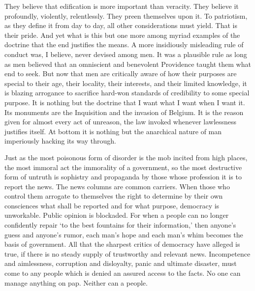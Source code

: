 \documentclass[openany,nobib,nohyper]{tufte-book}
\begin{document}
They believe that edification is more important than veracity. They
believe it profoundly, violently, relentlessly. They preen themselves
upon it. To patriotism, as they define it from day to day, all other
considerations must yield. That is their pride. And yet what is this but
one more among myriad examples of the doctrine that the end justifies
the means. A more insidiously misleading rule of conduct was, I believe,
never devised among men. It was a plausible rule as long as men believed
that an omniscient and benevolent Providence taught them what end to
seek. But now that men are critically aware of how their purposes are
special to their age, their locality, their interests, and their limited
knowledge, it is blazing arrogance to sacrifice hard-won standards of
credibility to some special purpose. It is nothing but the doctrine that
I want what I want when I want it. Its monuments are the Inquisition and
the invasion of Belgium. It is the reason given for almost every act of
unreason, the law invoked whenever lawlessness justifies itself. At
bottom it is nothing but the anarchical nature of man imperiously
hacking its way through.

Just as the most poisonous form of disorder is the mob incited from high
places, the most immoral act the immorality of a government, so the most
destructive form of untruth is sophistry and propaganda by those whose
profession it is to report the news. The news columns are common
carriers. When those who control them arrogate to themselves the right
to determine by their own consciences what shall be reported and for
what purpose, democracy is unworkable. Public opinion is blockaded. For
when a people can no longer confidently repair `to the best fountains
for their information,' then anyone's guess and anyone's rumor, each
man's hope and each man's whim becomes the basis of government. All that
the sharpest critics of democracy have alleged is true, if there is no
steady supply of trustworthy and relevant news. Incompetence and
aimlessness, corruption and disloyalty, panic and ultimate disaster,
must come to any people which is denied an assured access to the facts.
No one can manage anything on pap. Neither can a people.
\end{document}
